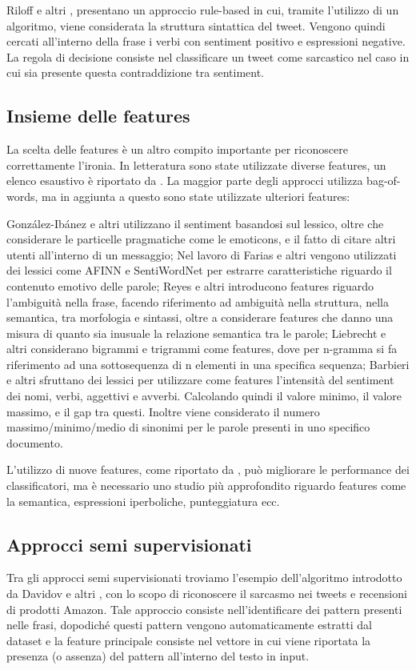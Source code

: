 \documentclass[oneside]{book}
\begin{document}
Riloff e altri \cite{rilof}, presentano un approccio rule-based in cui, tramite l'utilizzo di un algoritmo, viene considerata la struttura sintattica del tweet. Vengono quindi cercati all'interno della frase i verbi con sentiment positivo e espressioni negative. La regola di decisione consiste nel classificare un tweet come sarcastico nel caso in cui sia presente questa contraddizione tra sentiment.


\subsection{Insieme delle features}
La scelta delle features è un altro compito importante per riconoscere correttamente l'ironia.
In letteratura sono state utilizzate diverse features, un elenco esaustivo è riportato da \cite{survey5}. La maggior parte degli approcci utilizza bag-of-words, ma in aggiunta a questo sono state utilizzate ulteriori features:

González-Ibánez e altri \cite{gonzalez} utilizzano il sentiment basandosi sul lessico, oltre che considerare le particelle pragmatiche come le emoticons, e il fatto di citare altri utenti all'interno di un messaggio;
Nel lavoro di Farias e altri \cite{farias} vengono utilizzati dei lessici come AFINN e SentiWordNet per estrarre caratteristiche riguardo il contenuto emotivo delle parole;
Reyes e altri \cite{reyes} introducono features riguardo l'ambiguità nella frase, facendo riferimento ad ambiguità nella struttura, nella semantica, tra morfologia e sintassi, oltre a considerare features che danno una misura di quanto sia inusuale la relazione semantica tra le parole; Liebrecht e altri \cite{gram} considerano bigrammi e trigrammi come features, dove per n-gramma si fa riferimento ad una sottosequenza di n elementi in una specifica sequenza;
Barbieri e altri \cite{sarcasm-ita} sfruttano dei lessici per utilizzare come features l'intensità del sentiment dei nomi, verbi, aggettivi e avverbi. Calcolando quindi il valore minimo, il valore massimo, e il gap tra questi. Inoltre viene considerato il numero massimo/minimo/medio di sinonimi per le parole presenti in uno specifico documento.


L'utilizzo di nuove features, come riportato da \cite{survey1}, può migliorare le performance dei classificatori, ma  è necessario uno studio più approfondito riguardo features come la semantica, espressioni iperboliche, punteggiatura ecc. 

\subsection{Approcci semi supervisionati}
Tra gli approcci semi supervisionati troviamo l'esempio dell'algoritmo introdotto da Davidov e altri \cite{davidov}, con lo scopo di  riconoscere il sarcasmo nei tweets e recensioni di prodotti Amazon. Tale approccio consiste nell'identificare dei pattern presenti nelle frasi, dopodiché questi pattern vengono automaticamente estratti dal dataset e la feature principale consiste nel vettore in cui viene riportata la presenza (o assenza) del pattern all'interno del testo in input.
\end{document}
